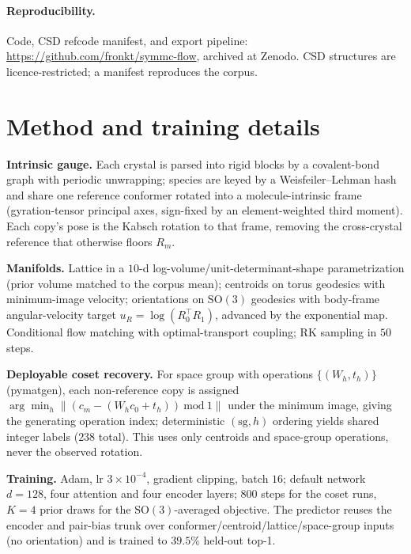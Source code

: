 \documentclass[10pt]{article}
\begin{document}
\paragraph{Reproducibility.} Code, CSD refcode manifest, and export pipeline:
\url{https://github.com/fronkt/symmc-flow}, archived at
Zenodo\cite{cai2026symmcflow}. CSD structures are licence-restricted; a manifest
reproduces the corpus.

\small



\normalsize
\appendix
\section{Method and training details}
\label{app:method}
\textbf{Intrinsic gauge.} Each crystal is parsed into rigid blocks by a
covalent-bond graph with periodic unwrapping; species are keyed by a
Weisfeiler--Lehman hash and share one reference conformer rotated into a
molecule-intrinsic frame (gyration-tensor principal axes, sign-fixed by an
element-weighted third moment). Each copy's pose is the Kabsch rotation to that
frame, removing the cross-crystal reference that otherwise floors $R_m$.

\textbf{Manifolds.} Lattice in a $10$-d log-volume/unit-determinant-shape
parametrization (prior volume matched to the corpus mean); centroids on torus
geodesics with minimum-image velocity; orientations on $\mathrm{SO}(3)$ geodesics
with body-frame angular-velocity target $u_R=\log(R_0^\top R_1)$, advanced by the
exponential map. Conditional flow matching\cite{lipman2023flowmatching} with
optimal-transport coupling\cite{pooladian2023multisample}; RK sampling in $50$
steps.

\textbf{Deployable coset recovery.} For space group with operations
$\{(W_h,t_h)\}$ (pymatgen), each non-reference copy is assigned
$\arg\min_h \lVert (c_m-(W_h c_0+t_h))\ \mathrm{mod}\ 1\rVert$ under the minimum
image, giving the generating operation index; deterministic $(\text{sg},h)$
ordering yields shared integer labels ($238$ total). This uses only centroids and
space-group operations, never the observed rotation.

\textbf{Training.} Adam, lr $3\times10^{-4}$, gradient clipping, batch $16$;
default network $d{=}128$, four attention and four encoder layers; $800$ steps for
the coset runs, $K{=}4$ prior draws for the $\mathrm{SO}(3)$-averaged objective.
The predictor reuses the encoder and pair-bias trunk over
conformer/centroid/lattice/space-group inputs (no orientation) and is trained to
$39.5\%$ held-out top-1.
\end{document}
